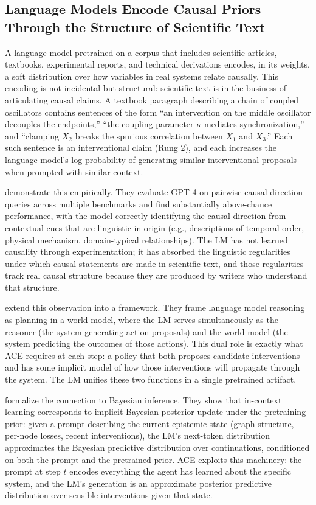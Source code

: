 \subsection{Language Models Encode Causal Priors Through the Structure of Scientific Text}

A language model pretrained on a corpus that includes scientific articles, textbooks, experimental reports, and technical derivations encodes, in its weights, a soft distribution over how variables in real systems relate causally. This encoding is not incidental but structural: scientific text is in the business of articulating causal claims. A textbook paragraph describing a chain of coupled oscillators contains sentences of the form ``an intervention on the middle oscillator decouples the endpoints,'' ``the coupling parameter $\kappa$ mediates synchronization,'' and ``clamping $X_2$ breaks the spurious correlation between $X_1$ and $X_3$.'' Each such sentence is an interventional claim (Rung 2), and each increases the language model's log-probability of generating similar interventional proposals when prompted with similar context.

\citet{kiciman2023causal} demonstrate this empirically. They evaluate GPT-4 on pairwise causal direction queries across multiple benchmarks and find substantially above-chance performance, with the model correctly identifying the causal direction from contextual cues that are linguistic in origin (e.g., descriptions of temporal order, physical mechanism, domain-typical relationships). The LM has not learned causality through experimentation; it has absorbed the linguistic regularities under which causal statements are made in scientific text, and those regularities track real causal structure because they are produced by writers who understand that structure.

\citet{hao2023reasoning} extend this observation into a framework. They frame language model reasoning as planning in a world model, where the LM serves simultaneously as the reasoner (the system generating action proposals) and the world model (the system predicting the outcomes of those actions). This dual role is exactly what ACE requires at each step: a policy that both proposes candidate interventions and has some implicit model of how those interventions will propagate through the system. The LM unifies these two functions in a single pretrained artifact.

\citet{xie2022explanation} formalize the connection to Bayesian inference. They show that in-context learning corresponds to implicit Bayesian posterior update under the pretraining prior: given a prompt describing the current epistemic state (graph structure, per-node losses, recent interventions), the LM's next-token distribution approximates the Bayesian predictive distribution over continuations, conditioned on both the prompt and the pretrained prior. ACE exploits this machinery: the prompt at step $t$ encodes everything the agent has learned about the specific system, and the LM's generation is an approximate posterior predictive distribution over sensible interventions given that state.

